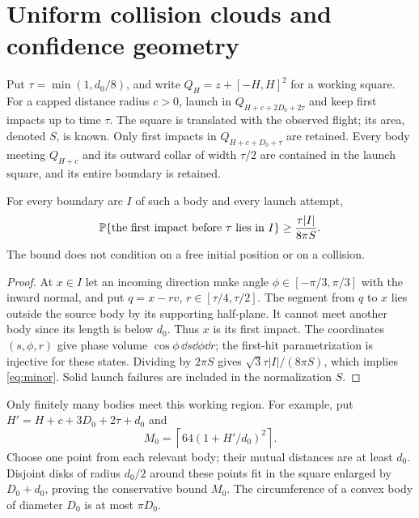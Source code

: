 \section{Uniform collision clouds and confidence geometry}\label{sec:clouds}
Put $\tau=\min(1,d_0/8)$, and write $Q_H=z+[-H,H]^2$ for a working
square. For a capped distance radius $c>0$, launch in
$Q_{H+c+2D_0+2\tau}$ and keep first impacts up to time $\tau$.
The square is translated with the observed flight; its area, denoted $S$,
is known. Only first impacts in $Q_{H+c+D_0+\tau}$ are retained.
Every body meeting $Q_{H+c}$ and its outward collar of width $\tau/2$
are contained in the launch square, and its entire boundary is retained.

\begin{lemma}\label{lem:flux-minor}
For every boundary arc $I$ of such a body and every launch attempt,
\begin{equation}\label{eq:minor}
 \mathbb P\{\hbox{the first impact before }\tau\hbox{ lies in }I\}
                         \ge \frac{\tau|I|}{8\pi S}.
\end{equation}
The bound does not condition on a free initial position or on a collision.
\end{lemma}
\begin{proof}
At $x\in I$ let an incoming direction make angle $\phi\in[-\pi/3,\pi/3]$
with the inward normal, and put $q=x-rv$, $r\in[\tau/4,\tau/2]$.
The segment from $q$ to $x$ lies outside the source body by its supporting
half-plane. It cannot meet another body since its length is below $d_0$.
Thus $x$ is its first impact. The coordinates $(s,\phi,r)$ give phase
volume $\cos\phi\,\dd s\dd\phi\dd r$; the first-hit parametrization is
injective for these states. Dividing by $2\pi S$ gives
$\sqrt3\tau|I|/(8\pi S)$, which implies \eqref{eq:minor}.
Solid launch failures are included in the normalization $S$.
\end{proof}

Only finitely many bodies meet this working region. For example, put
$H'=H+c+3D_0+2\tau+d_0$ and
\[
 M_0=\left\lceil64(1+H'/d_0)^2\right\rceil.
\]
Choose one point from each relevant body; their mutual distances are at
least $d_0$. Disjoint disks of radius $d_0/2$ around these points fit in
the square enlarged by $D_0+d_0$, proving the conservative bound $M_0$.
The circumference of a convex body of diameter $D_0$ is at most $\pi D_0$.

